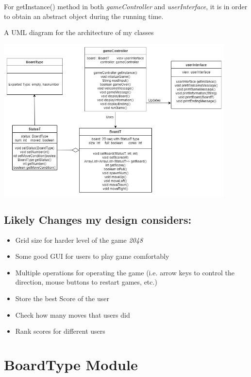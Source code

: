 \documentclass[12pt]{article}
\begin{document}
\medskip
For getInstance() method in both \textit{gameController} and \textit{userInterface}, it is in order to obtain an abstract object during
the running time. 

\bigskip

\noindent A UML diagram for the architecture of my classes

\medskip

\includegraphics[width=0.9\textwidth]{A4UML.png}

\newpage

\subsection*{Likely Changes my design considers:}

\begin{itemize}
  \item Grid size for harder level of the game \textit{2048}
  \item Some good GUI for users to play game comfortably
  \item Multiple operations for operating the game (i.e. arrow keys to control the direction, mouse buttons to restart games, etc.)
  \item Store the best Score of the user
  \item Check how many moves that users did
  \item Rank scores for different users
\end{itemize}

\newpage

\section* {BoardType Module}
\end{document}
